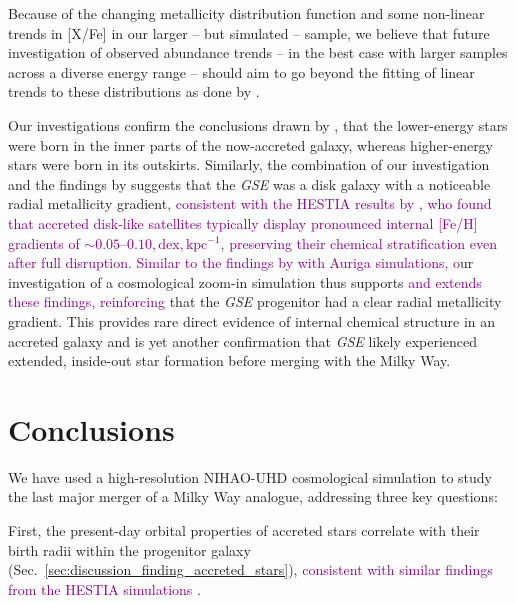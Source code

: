 \documentclass[fleqn,usenatbib]{mnras}
\newcommand{\changed}[1]{{\textcolor{purple}{#1}}}
\begin{document}
Because of the changing metallicity distribution function and some non-linear trends in [X/Fe] in our larger -- but simulated -- sample, we believe that future investigation of observed abundance trends -- in the best case with larger samples across a diverse energy range -- should aim to go beyond the fitting of linear trends to these distributions as done by \citet{Skuladottir2025}.

Our investigations confirm the conclusions drawn by \citet{Skuladottir2025}, that the lower-energy stars were born in the inner parts of the now-accreted galaxy, whereas higher-energy stars were born in its outskirts. Similarly, the combination of our investigation and the findings by \citet{Skuladottir2025} suggests that the \textit{GSE} was a disk galaxy with a noticeable radial metallicity gradient\changed{, consistent with the HESTIA results by \citet{Khoperskov2023c}, who found that accreted disk-like satellites typically display pronounced internal [Fe/H] gradients of $\sim0.05$–$0.10,\mathrm{dex,kpc^{-1}}$, preserving their chemical stratification even after full disruption.} \changed{Similar to the findings by \citet{Carrillo2025} with Auriga simulations, o}ur investigation of a cosmological zoom-in simulation thus supports \changed{and extends these findings, reinforcing} that the \textit{GSE} progenitor had a clear radial metallicity gradient. This provides rare direct evidence of internal chemical structure in an accreted galaxy and is yet another confirmation that \textit{GSE} likely experienced extended, inside-out star formation before merging with the Milky Way.

\section{Conclusions}
\label{sec:conclusions}

We have used a high-resolution NIHAO-UHD cosmological simulation to study the last major merger of a Milky Way analogue, addressing three key questions:

First, the present-day orbital properties of accreted stars correlate with their birth radii within the progenitor galaxy (Sec.~\ref{sec:discussion_finding_accreted_stars}), \changed{consistent with similar findings from the HESTIA simulations \citep{Khoperskov2023b}}.
\end{document}
